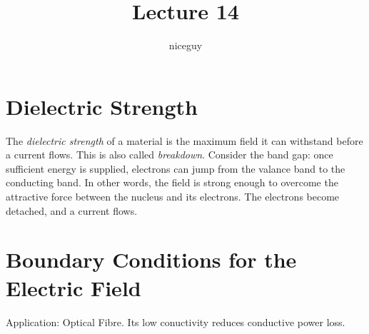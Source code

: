 \documentclass[12pt]{article}
\author{niceguy}
\title{Lecture 14}
\begin{document}
\maketitle

\section{Dielectric Strength}

The \emph{dielectric strength} of a material is the maximum field it can withstand before a current flows. This is also called \emph{breakdown}. Consider the band gap: once sufficient energy is supplied, electrons can jump from the valance band to the conducting band. In other words, the field is strong enough to overcome the attractive force between the nucleus and its electrons. The electrons become detached, and a current flows.

\section{Boundary Conditions for the Electric Field}

Application: Optical Fibre. Its low conuctivity reduces conductive power loss.
\end{document}
